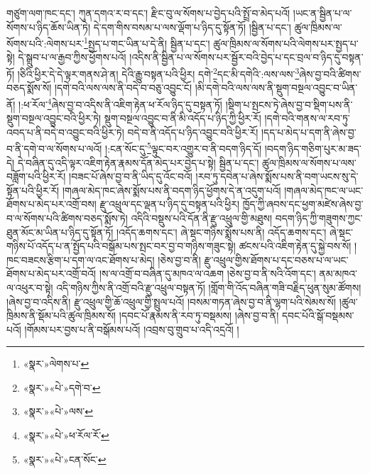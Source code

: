གཙུག་ལག་ཁང་དང་། ཀུན་དགའ་ར་བ་དང་། རྫིང་བུ་ལ་སོགས་པ་བྱེད་པའི་སྤྲོ་བ་མེད་པའོ། །ཡང་ན་སྦྱིན་པ་ལ་སོགས་པ་ཉིད་ཆོས་ཡིན་ཏེ། དེ་དག་གིས་བསམ་པ་ལས་ལྡོག་པ་ཉིད་དུ་སྟོན་ཏོ། །སྦྱིན་པ་དང་། ཚུལ་ཁྲིམས་ལ་སོགས་པའི་:ལེགས་པར་\footnote{«སྣར་»ལེགས་པ་}སྤྱད་པ་གང་ཡིན་པ་དེ་ནི། སྦྱིན་པ་དང་། ཚུལ་ཁྲིམས་ལ་སོགས་པའི་ལེགས་པར་སྤྱད་པ་སྟེ། དེ་སྒྲུབ་པ་ལ་རྒྱབ་ཀྱིས་ཕྱོགས་པའོ། །འདིས་ནི་སྦྱིན་པ་ལ་སོགས་པར་སྦྱོར་བའི་བྱེད་པ་དང་བྲལ་བ་ཉིད་དུ་བསྟན་ཏོ། །ཅིའི་ཕྱིར་དེ་དེ་ལྟར་གནས་ཤེ་ན། དེའི་རྒྱུ་བསྟན་པའི་ཕྱིར། དགེ་\footnote{«སྣར་»«པེ་»དགེ་བ་}དང་མི་དགེའི་:ལས་ལས་\footnote{«སྣར་»«པེ་»ལས་}ཞེས་བྱ་བའི་ཚིགས་བཅད་སྨོས་སོ། །དགེ་བའི་ལས་ལས་ནི་བདེ་བ་བཅུ་འབྱུང་ངོ། །མི་དགེ་བའི་ལས་ལས་ནི་སྡུག་བསྔལ་འབྱུང་བ་ཡིན་ནོ། །:ཕ་རོལ་\footnote{«སྣར་»«པེ་»ཕ་རོལ་རོ་}ཞེས་བྱ་བ་འདིས་ནི་འཇིག་རྟེན་ཕ་རོལ་ཉིད་དུ་བསྟན་ཏོ། །སྡིག་པ་སྤངས་ཏེ་ཞེས་བྱ་བ་སྡིག་པས་ནི་སྡུག་བསྔལ་འབྱུང་བའི་ཕྱིར་ཏེ། སྡུག་བསྔལ་འབྱུང་བ་ནི་མི་འདོད་པ་ཉིད་ཀྱི་ཕྱིར་རོ། །དགེ་བའི་གནས་ལ་རབ་ཏུ་འབད་པ་ནི་བདེ་བ་འབྱུང་བའི་ཕྱིར་ཏེ། བདེ་བ་ནི་འདོད་པ་ཉིད་འབྱུང་བའི་ཕྱིར་རོ། །དད་པ་མེད་པ་དག་ནི་ཞེས་བྱ་བ་ནི་དགེ་བ་ལ་སོགས་པ་ལའོ། །:ངན་སོང་དུ་\footnote{«སྣར་»«པེ་»ངན་སོང་}ལྟུང་བར་འགྱུར་བ་ནི་བདག་ཉིད་དོ། །བདག་ཉིད་གཅིག་པུར་མ་ཟད་དེ། དེ་བཞིན་དུ་འདི་ལྟར་འཇིག་རྟེན་རྣམས་དོན་མེད་པར་བྱེད་པ་སྟེ། སྦྱིན་པ་དང་། ཚུལ་ཁྲིམས་ལ་སོགས་པ་ལས་བཟློག་པའི་ཕྱིར་རོ། །བཟང་པོ་ཞེས་བྱ་བ་ནི་ཡིད་དུ་འོང་བའོ། །རབ་ཏུ་དབེན་པ་ཞེས་སྨོས་པས་ནི་བག་ཡངས་སུ་དེ་སྟོན་པའི་ཕྱིར་རོ། །གཞལ་མེད་ཁང་ཞེས་སྨོས་པས་ནི་བདག་ཉིད་ཕྱོགས་དེ་ན་འདུག་པའོ། །གཞལ་མེད་ཁང་ལ་ཡང་ཐོགས་པ་མེད་པར་འགྲོ་བས། རྫུ་འཕྲུལ་དང་ལྡན་པ་ཉིད་དུ་བསྟན་པའི་ཕྱིར། ཁྱོད་ཀྱི་ཞབས་དང་ཕྱག་མཛེས་ཞེས་བྱ་བ་ལ་སོགས་པའི་ཚིགས་བཅད་སྨོས་ཏེ། འདིའི་བསྡུས་པའི་དོན་ནི་རྫུ་འཕྲུལ་གྱི་མཐུས། བདག་ཉིད་ཀྱི་གཟུགས་ཀྱང་ཐུན་མོང་མ་ཡིན་པ་ཉིད་དུ་སྟོན་ཏོ། །འདོད་ཆགས་དང་། ཞེ་སྡང་གཉིས་སྨོས་པས་ནི། འདོད་ཆགས་དང་། ཞེ་སྡང་གཉིས་པོ་འདོད་པ་ན་སྤྱོད་པའི་བསྒོམ་པས་སྤང་བར་བྱ་བ་གཉིས་གཟུང་སྟེ། ཚངས་པའི་འཇིག་རྟེན་དུ་སྐྱེ་བས་སོ། །ཁང་བཟངས་རྩིག་པ་དག་ལ་འང་ཐོགས་པ་མེད། །ཅེས་བྱ་བ་ནི། རྫུ་འཕྲུལ་གྱིས་ཐོགས་པ་དང་བཅས་པ་ལ་ཡང་ཐོགས་པ་མེད་པར་འགྲོ་བའོ། །ས་ལ་འགྲོ་བ་བཞིན་དུ་མཁའ་ལ་འཆག །ཅེས་བྱ་བ་ནི་སའི་འོག་དང་། ནམ་མཁའ་ལ་འཕུར་བ་སྟེ། འདི་གཉིས་ཀྱིས་ནི་འགྲོ་བའི་རྫུ་འཕྲུལ་བསྟན་ཏོ། །གློག་གི་འོད་བཞིན་གཟི་བརྗིད་ཕུན་སུམ་ཚོགས། །ཞེས་བྱ་བ་འདིས་ནི། རྫུ་འཕྲུལ་གྱི་ཆོ་འཕྲུལ་གྱི་སྤྲུལ་པའོ། །བསམ་གཏན་ཞེས་བྱ་བ་ནི་ལྷག་པའི་སེམས་སོ། །ཚུལ་ཁྲིམས་ནི་སྡོམ་པའི་ཚུལ་ཁྲིམས་སོ། །དབང་པོ་རྣམས་ནི་རབ་ཏུ་བསྡམས། །ཞེས་བྱ་བ་ནི། དབང་པོའི་སྒོ་བསྡམས་པའོ། །གོམས་པར་བྱས་པ་ནི་བསྒོམས་པའོ། །འབྲས་བུ་གྲུབ་པ་འདི་འདྲའོ། །
